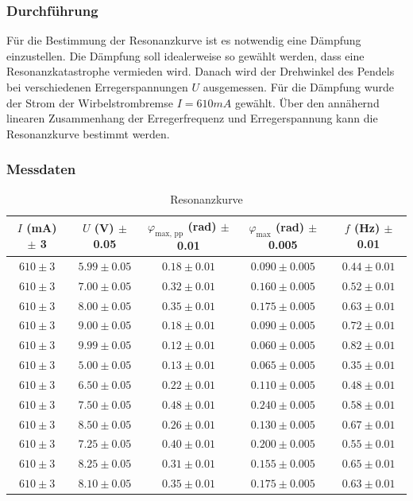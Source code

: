 \documentclass{article}
\begin{document}
\subsubsection{Durchführung}
Für die Bestimmung der Resonanzkurve ist es notwendig eine Dämpfung einzustellen. Die Dämpfung soll idealerweise so gewählt werden,
dass eine Resonanzkatastrophe vermieden wird. Danach wird der Drehwinkel des Pendels bei verschiedenen Erregerspannungen $U$ ausgemessen.
Für die Dämpfung wurde der Strom der Wirbelstrombremse $I = 610 mA$ gewählt. Über den annähernd linearen Zusammenhang der Erregerfrequenz
und Erregerspannung kann die Resonanzkurve bestimmt werden.

\subsubsection{Messdaten}
\begin{table}[H]
    \centering
    \begin{tabular}{|c|c|c|c|c|}
    \hline
    $I$ (mA) $\pm$ 3 & $U$ (V) $\pm$ 0.05 & $\varphi_{\text{max, pp}}$ (rad) $\pm$ 0.01 & $\varphi_{\text{max}}$ (rad) $\pm$ 0.005 & $f$ (Hz) $\pm$ 0.01 \\
    \hline
    $610 \pm 3$ & $5.99 \pm 0.05$ & $0.18 \pm 0.01$ & $0.090 \pm 0.005$ & $0.44 \pm 0.01$ \\
    $610 \pm 3$ & $7.00 \pm 0.05$ & $0.32 \pm 0.01$ & $0.160 \pm 0.005$ & $0.52 \pm 0.01$ \\
    $610 \pm 3$ & $8.00 \pm 0.05$ & $0.35 \pm 0.01$ & $0.175 \pm 0.005$ & $0.63 \pm 0.01$ \\
    $610 \pm 3$ & $9.00 \pm 0.05$ & $0.18 \pm 0.01$ & $0.090 \pm 0.005$ & $0.72 \pm 0.01$ \\
    $610 \pm 3$ & $9.99 \pm 0.05$ & $0.12 \pm 0.01$ & $0.060 \pm 0.005$ & $0.82 \pm 0.01$ \\
    $610 \pm 3$ & $5.00 \pm 0.05$ & $0.13 \pm 0.01$ & $0.065 \pm 0.005$ & $0.35 \pm 0.01$ \\
    $610 \pm 3$ & $6.50 \pm 0.05$ & $0.22 \pm 0.01$ & $0.110 \pm 0.005$ & $0.48 \pm 0.01$ \\
    $610 \pm 3$ & $7.50 \pm 0.05$ & $0.48 \pm 0.01$ & $0.240 \pm 0.005$ & $0.58 \pm 0.01$ \\
    $610 \pm 3$ & $8.50 \pm 0.05$ & $0.26 \pm 0.01$ & $0.130 \pm 0.005$ & $0.67 \pm 0.01$ \\
    $610 \pm 3$ & $7.25 \pm 0.05$ & $0.40 \pm 0.01$ & $0.200 \pm 0.005$ & $0.55 \pm 0.01$ \\
    $610 \pm 3$ & $8.25 \pm 0.05$ & $0.31 \pm 0.01$ & $0.155 \pm 0.005$ & $0.65 \pm 0.01$ \\
    $610 \pm 3$ & $8.10 \pm 0.05$ & $0.35 \pm 0.01$ & $0.175 \pm 0.005$ & $0.63 \pm 0.01$ \\
    \hline
    \end{tabular}
    \caption{Resonanzkurve}
    \label{tab:resonanzkurve}
\end{table}
\end{document}

